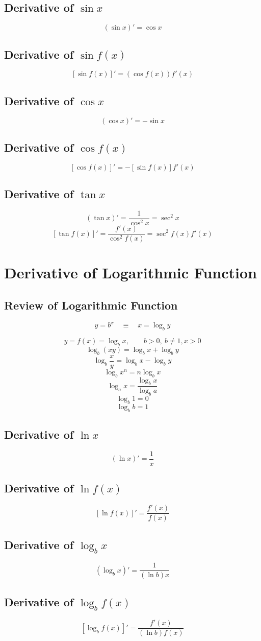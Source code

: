 		\subsection{Derivative of $\sin x$}
			\[(\sin x)' = \cos x\]
		\subsection{Derivative of $\sin f(x)$}
			\[[\sin f(x)]' = (\cos f(x))f'(x)\]
		\subsection{Derivative of $\cos x$}
			\[(\cos x)' = -\sin x\]
		\subsection{Derivative of $\cos f(x)$}
			\[[\cos f(x)]' = -[\sin f(x)]f'(x)\]
		\subsection{Derivative of $\tan x$}
			\[(\tan x)' = \frac{1}{\cos^2 x} = \sec^2 x\]
			\[[\tan f(x)]' = \frac{f'(x)}{\cos^2 f(x)} = \sec^2f(x)f'(x)\]
	\section{Derivative of Logarithmic Function}
		\subsection{Review of Logarithmic Function}
			\[y=b^x \quad \equiv \quad x=\log_b y\]

			\[y=f(x)=\log_b x,\qquad b > 0,\ b \neq 1, x > 0\]
			\[\log_b (xy) = \log_b x + \log_b y\]
			\[\log_b \frac{x}{y} = \log_b x - \log_b y\]
			\[\log_b x^n = n\log_b x\]
			\[\log_a x = \frac{\log_b x}{\log_b a}\]
			\[\log_b 1 = 0\]
			\[\log_b b = 1\]
		\subsection{Derivative of $\ln x$}
			\[(\ln x)' = \frac{1}{x}\]
		\subsection{Derivative of $\ln f(x)$}
			\[[\ln f(x)]' = \frac{f'(x)}{f(x)}\]
		\subsection{Derivative of $\log_b x$}
			\[(\log_b x)' = \frac{1}{(\ln b)x}\]
		\subsection{Derivative of $\log_b f(x)$}
			\[[\log_b f(x)]' = \frac{f'(x)}{(\ln b)f(x)}\]
